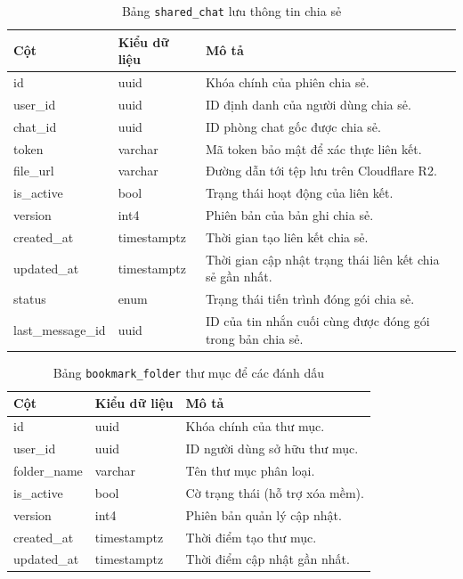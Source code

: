 \begin{table}[H]
\centering
\begin{tabular}{|l|l|p{6cm}|}
\hline
\textbf{Cột} & \textbf{Kiểu dữ liệu} & \textbf{Mô tả} \\ \hline
id & uuid & Khóa chính của phiên chia sẻ. \\ \hline
user\_id & uuid & ID định danh của người dùng chia sẻ. \\ \hline
chat\_id & uuid & ID phòng chat gốc được chia sẻ. \\ \hline
token & varchar & Mã token bảo mật để xác thực liên kết. \\ \hline
file\_url & varchar & Đường dẫn tới tệp lưu trên Cloudflare R2. \\ \hline
is\_active & bool & Trạng thái hoạt động của liên kết. \\ \hline
version & int4 & Phiên bản của bản ghi chia sẻ. \\ \hline
created\_at & timestamptz & Thời gian tạo liên kết chia sẻ. \\ \hline
updated\_at & timestamptz & Thời gian cập nhật trạng thái liên kết chia sẻ gần nhất. \\ \hline
status & enum & Trạng thái tiến trình đóng gói chia sẻ. \\ \hline
last\_message\_id & uuid & ID của tin nhắn cuối cùng được đóng gói trong bản chia sẻ. \\ \hline
\end{tabular}
\caption{Bảng \texttt{shared\_chat} lưu thông tin chia sẻ}
\end{table}

\begin{table}[H]
\centering
\begin{tabular}{|l|l|p{6cm}|}
\hline
\textbf{Cột} & \textbf{Kiểu dữ liệu} & \textbf{Mô tả} \\ \hline
id & uuid & Khóa chính của thư mục. \\ \hline
user\_id & uuid & ID người dùng sở hữu thư mục. \\ \hline
folder\_name & varchar & Tên thư mục phân loại. \\ \hline
is\_active & bool & Cờ trạng thái (hỗ trợ xóa mềm). \\ \hline
version & int4 & Phiên bản quản lý cập nhật. \\ \hline
created\_at & timestamptz & Thời điểm tạo thư mục. \\ \hline
updated\_at & timestamptz & Thời điểm cập nhật gần nhất. \\ \hline
\end{tabular}
\caption{Bảng \texttt{bookmark\_folder} thư mục để các đánh dấu}
\end{table}

